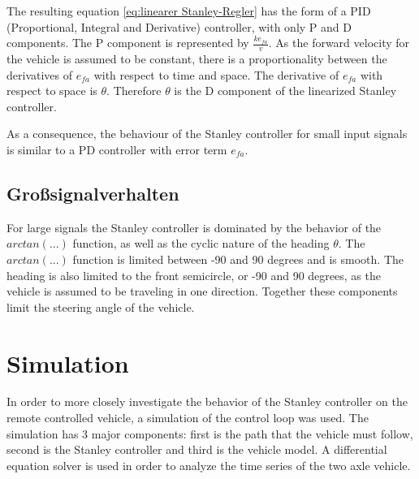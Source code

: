 \documentclass[arbeit=studie,oneside,BCOR=12mm]{ArbeitRST}
\begin{document}
The resulting equation \eqref{eq:linearer Stanley-Regler} has the form of a PID
(Proportional, Integral and Derivative) controller, with only P and D
components. The P component is represented by \(\frac{ke_{fa}}{v}\). As the
forward velocity for the vehicle is assumed to be constant, there is a
proportionality between the derivatives of \(e_{fa}\) with respect to time and
space. The derivative of \(e_{fa}\) with respect to space is \(\theta\).
Therefore \(\theta\) is the D component of the linearized Stanley controller.

As a consequence, the behaviour of the Stanley controller for small input
signals is similar to a PD controller with error term \(e_{fa}\). 

\subsection{Gro{\ss}signalverhalten}

For large signals the Stanley controller is dominated by the behavior of the
\(arctan(...)\) function, as well as the cyclic nature of the heading
\(\theta\). The \(arctan(...)\) function is limited between -90 and 90 degrees
and is smooth. The heading is also limited to the front semicircle, or -90 and
90 degrees, as the vehicle is assumed to be traveling in one direction.
Together these components limit the steering angle of the vehicle.

\iffalse

When dealing with large signals, the behavior of the Stanley controller is
mainly influenced by two factors: the cyclic nature of the heading \(\theta\)
and the \(arctan(...)\) function. The \(arctan(...)\) function is a smooth
function that is limited to a range between -90 and 90 degrees. On the other
hand, the heading is constrained to the front semicircle, which is between -90
and 90 degrees, as the vehicle is assumed to be traveling in one direction. As
a result, these two factors work in tandem to restrict the steering angle of
the vehicle, preventing it from becoming too large.

\fi

\section{Simulation}

\iffalse
In order to more closely investigate the behavior of the Stanley controller on
the remote controlled vehicle, a simulation of the control loop was used. The
simulation has 3 major components: first is the path that the vehicle must
follow, second is the Stanley controller and third is the vehicle model. A
differential equation solver is used in order to analyze the time series of the
two axle vehicle. 
\end{document}
